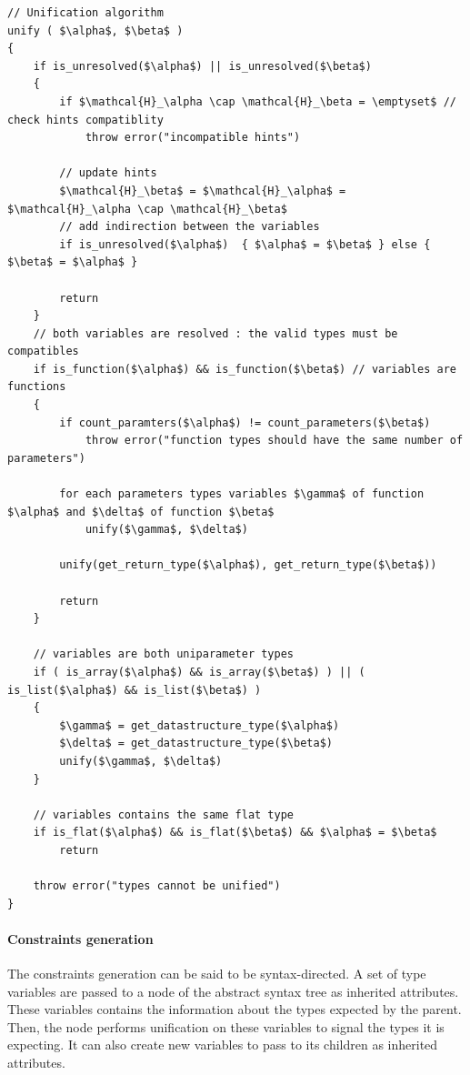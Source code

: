 \documentclass[a4paper,11pt]{article}
\begin{document}
\begin{center}
\begin{minipage}{0.75\linewidth}
\begin{lstlisting}[mathescape,caption={Unification algorithm},label={lst:unification}]
// Unification algorithm
unify ( $\alpha$, $\beta$ )
{
	if is_unresolved($\alpha$) || is_unresolved($\beta$)
	{
		if $\mathcal{H}_\alpha \cap \mathcal{H}_\beta = \emptyset$ // check hints compatiblity
			throw error("incompatible hints")

	 	// update hints
	 	$\mathcal{H}_\beta$ = $\mathcal{H}_\alpha$ = $\mathcal{H}_\alpha \cap \mathcal{H}_\beta$
		// add indirection between the variables
		if is_unresolved($\alpha$)	{ $\alpha$ = $\beta$ } else { $\beta$ = $\alpha$ }

		return
	}
	// both variables are resolved : the valid types must be compatibles
	if is_function($\alpha$) && is_function($\beta$) // variables are functions
	{
		if count_paramters($\alpha$) != count_parameters($\beta$)
			throw error("function types should have the same number of parameters")

		for each parameters types variables $\gamma$ of function $\alpha$ and $\delta$ of function $\beta$
			unify($\gamma$, $\delta$)

		unify(get_return_type($\alpha$), get_return_type($\beta$))

		return
	}

	// variables are both uniparameter types
	if ( is_array($\alpha$) && is_array($\beta$) ) || ( is_list($\alpha$) && is_list($\beta$) )
	{
		$\gamma$ = get_datastructure_type($\alpha$)
		$\delta$ = get_datastructure_type($\beta$)
		unify($\gamma$, $\delta$)
	}

	// variables contains the same flat type
	if is_flat($\alpha$) && is_flat($\beta$) && $\alpha$ = $\beta$
		return

	throw error("types cannot be unified")
}
\end{lstlisting}
\end{minipage}
\end{center}

\paragraph{Constraints generation} The constraints generation can be said to be syntax-directed. A set of type variables are passed to a node of the abstract syntax tree as inherited attributes. These variables contains the information about the types expected by the parent. Then, the node performs unification on these variables to signal the types it is expecting. It can also create new variables to pass to its children as inherited attributes.
\end{document}
